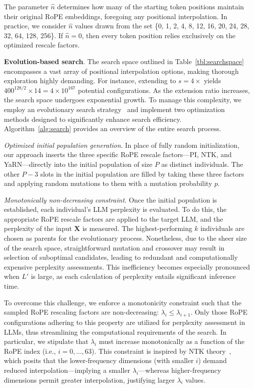 The parameter $\hat{n}$ determines how many of the starting token positions maintain their original RoPE embeddings, foregoing any positional interpolation. In practice, we consider $\hat{n}$ values drawn from the set \{0, 1, 2, 4, 8, 12, 16, 20, 24, 28, 32, 64, 128, 256\}. If $\hat{n}=0$, then every token position relies exclusively on the optimized rescale factors.

\textbf{Evolution-based search}. The search space outlined in Table~\ref{tbl:searchspace} encompasses a vast array of positional interpolation options, making thorough exploration highly demanding. For instance, extending to $s=4\times$ yields $400^{128/2}\times14=4\times10^{167}$ potential configurations. As the extension ratio increases, the search space undergoes exponential growth. To manage this complexity, we employ an evolutionary search strategy~\cite{guo2020single} and implement two optimization methods designed to significantly enhance search efficiency. Algorithm~\ref{alg:search} provides an overview of the entire search process.

\textit{Optimized initial population generation}. In place of fully random initialization, our approach inserts the three specific RoPE rescale factors—PI, NTK, and YaRN—directly into the initial population of size $P$ as distinct individuals. The other $P - 3$ slots in the initial population are filled by taking these three factors and applying random mutations to them with a mutation probability $p$.

\textit{Monotonically non-decreasing constraint}. Once the initial population is established, each individual’s LLM perplexity is evaluated. To do this, the appropriate RoPE rescale factors are applied to the target LLM, and the perplexity of the input $\mathbf{X}$ is measured. The highest-performing $k$ individuals are chosen as parents for the evolutionary process. Nonetheless, due to the sheer size of the search space, straightforward mutation and crossover may result in selection of suboptimal candidates, leading to redundant and computationally expensive perplexity assessments. This inefficiency becomes especially pronounced when $L'$ is large, as each calculation of perplexity entails significant inference time.

To overcome this challenge, we enforce a monotonicity constraint such that the sampled RoPE rescaling factors are non-decreasing: $\lambda_i \le \lambda_{i+1}$. Only those RoPE configurations adhering to this property are utilized for perplexity assessment in LLMs, thus streamlining the computational requirements of the search. In particular, we stipulate that $\lambda_i$ must increase monotonically as a function of the RoPE index (i.e., $i=0,\ldots,63$). This constraint is inspired by NTK theory~\cite{jacot2018neural,tancik2020fourier,ntk}, which posits that the lower-frequency dimensions (with smaller $i$) demand reduced interpolation—implying a smaller $\lambda_i$—whereas higher-frequency dimensions permit greater interpolation, justifying larger $\lambda_i$ values.

